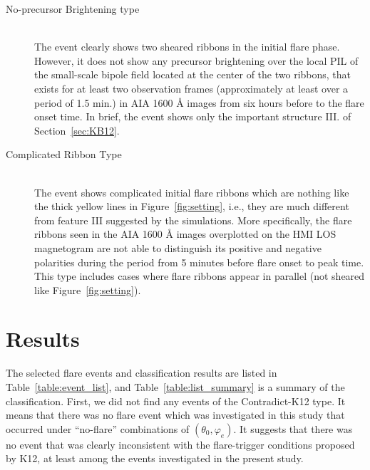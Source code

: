 \documentclass[10pt,preprint2]{aastex}
\begin{document}
\begin{description}
	\item[No-precursor Brightening type]\mbox{}\\
	The event clearly shows two sheared ribbons in the initial flare phase. However, it does not show any precursor brightening over the local PIL of the small-scale bipole field located at the center of the two ribbons, that exists for at least two observation frames (approximately at least over a period of 1.5 min.) in AIA 1600 {\AA} images from six hours before to the flare onset time. In brief, the event shows only the important structure I\hspace{-1pt}I\hspace{-1pt}I. of Section~\ref{sec:KB12}.
	
	\item[Complicated Ribbon Type]\mbox{}\\
	The event shows complicated initial flare ribbons which are nothing like the thick yellow lines in Figure~\ref{fig:setting}, i.e., they are much different from feature I\hspace{-1pt}I\hspace{-1pt}I suggested by the simulations. More specifically, the flare ribbons seen in the AIA 1600 {\AA} images overplotted on the HMI LOS magnetogram are not able to distinguish its positive and negative polarities during the period from 5 minutes before flare onset to peak time. This type includes cases where flare ribbons appear in parallel (not sheared like Figure~\ref{fig:setting}).
	
\end{description}


\section{Results} \label{sec:results}

The selected flare events and classification results are listed in Table~\ref{table:event_list}, and Table~\ref{table:list_summary} is a summary of the classification.
First, we did not find any events of the Contradict-K12 type.
It means that there was no flare event which was investigated in this study that occurred under ``no-flare'' combinations of $(\theta_{0}, \varphi_{e})$.
It suggests that there was no event that was clearly inconsistent with the flare-trigger conditions proposed by K12, at least among the events investigated in the present study.
\end{document}
